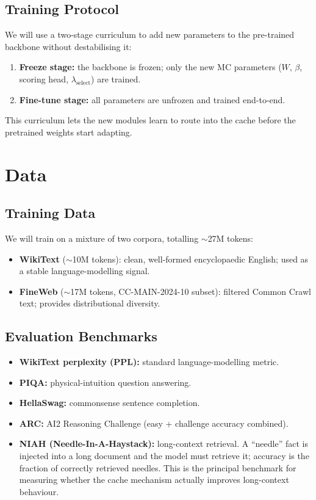\documentclass[conference]{IEEEtran}
\begin{document}
\subsection{Training Protocol}

We will use a two-stage curriculum to add new parameters to the pre-trained backbone without destabilising it:

\begin{enumerate}
    \item \textbf{Freeze stage:} the backbone is frozen; only the new MC parameters ($W$, $\beta$, scoring head, $\lambda_{\text{select}}$) are trained.
    \item \textbf{Fine-tune stage:} all parameters are unfrozen and trained end-to-end.
\end{enumerate}

This curriculum lets the new modules learn to route into the cache before the pretrained weights start adapting.

\section{Data}

\subsection{Training Data}

We will train on a mixture of two corpora, totalling $\sim$27M tokens:

\begin{itemize}
    \item \textbf{WikiText} ($\sim$10M tokens): clean, well-formed encyclopaedic English; used as a stable language-modelling signal.
    \item \textbf{FineWeb} ($\sim$17M tokens, CC-MAIN-2024-10 subset): filtered Common Crawl text; provides distributional diversity.
\end{itemize}

\subsection{Evaluation Benchmarks}

\begin{itemize}
    \item \textbf{WikiText perplexity (PPL):} standard language-modelling metric.
    \item \textbf{PIQA:} physical-intuition question answering.
    \item \textbf{HellaSwag:} commonsense sentence completion.
    \item \textbf{ARC:} AI2 Reasoning Challenge (easy + challenge accuracy combined).
    \item \textbf{NIAH (Needle-In-A-Haystack):} long-context retrieval. A ``needle'' fact is injected into a long document and the model must retrieve it; accuracy is the fraction of correctly retrieved needles. This is the principal benchmark for measuring whether the cache mechanism actually improves long-context behaviour.
\end{itemize}
\end{document}
